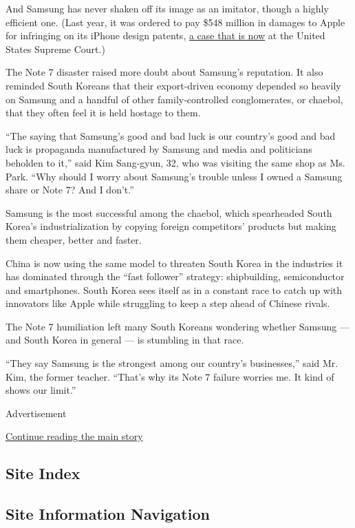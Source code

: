 And Samsung has never shaken off its image as an imitator, though a
highly efficient one. (Last year, it was ordered to pay \$548 million in
damages to Apple for infringing on its iPhone design patents,
\href{http://www.nytimes3xbfgragh.onion/2016/03/22/technology/supreme-court-to-hear-samsung-appeal-on-apple-patent-award.html}{a
case that is now} at the United States Supreme Court.)

The Note 7 disaster raised more doubt about Samsung's reputation. It
also reminded South Koreans that their export-driven economy depended so
heavily on Samsung and a handful of other family-controlled
conglomerates, or chaebol, that they often feel it is held hostage to
them.

``The saying that Samsung's good and bad luck is our country's good and
bad luck is propaganda manufactured by Samsung and media and politicians
beholden to it,'' said Kim Sang-gyun, 32, who was visiting the same shop
as Ms. Park. ``Why should I worry about Samsung's trouble unless I owned
a Samsung share or Note 7? And I don't.''

Samsung is the most successful among the chaebol, which spearheaded
South Korea's industrialization by copying foreign competitors' products
but making them cheaper, better and faster.

China is now using the same model to threaten South Korea in the
industries it has dominated through the ``fast follower'' strategy:
shipbuilding, semiconductor and smartphones. South Korea sees itself as
in a constant race to catch up with innovators like Apple while
struggling to keep a step ahead of Chinese rivals.

The Note 7 humiliation left many South Koreans wondering whether Samsung
--- and South Korea in general --- is stumbling in that race.

``They say Samsung is the strongest among our country's businesses,''
said Mr. Kim, the former teacher. ``That's why its Note 7 failure
worries me. It kind of shows our limit.''

Advertisement

\protect\hyperlink{after-bottom}{Continue reading the main story}

\hypertarget{site-index}{%
\subsection{Site Index}\label{site-index}}

\hypertarget{site-information-navigation}{%
\subsection{Site Information
Navigation}\label{site-information-navigation}}

